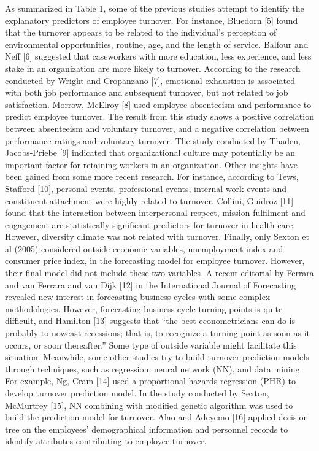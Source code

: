 As summarized in Table 1, some of the previous studies attempt to identify the explanatory predictors of employee turnover. For instance, Bluedorn [5] found that the turnover appears to be related to the individual’s perception of environmental opportunities, routine, age, and the length of service. Balfour and Neff [6] suggested that caseworkers with more education, less experience, and less stake in an organization are more likely to turnover. According to the research conducted by Wright and Cropanzano [7], emotional exhaustion is associated with both job performance and subsequent turnover, but not related to job satisfaction. Morrow, McElroy [8] used employee absenteeism and performance to predict employee turnover. The result from this study shows a positive correlation between absenteeism and voluntary turnover, and a negative correlation between performance ratings and voluntary turnover. The study conducted by Thaden, Jacobs-Priebe [9] indicated that organizational culture may potentially be an important factor for retaining  workers in an organization.  
Other insights have been gained from some more recent research.  For instance, according to Tews, Stafford [10], personal events, professional events, internal work events and constituent attachment were highly related to turnover. Collini, Guidroz [11] found that the interaction between interpersonal respect, mission fulfilment and engagement are statistically significant predictors for turnover in health care. However, diversity climate was not related with turnover. Finally, only Sexton et al (2005) considered outside economic variables, unemployment index and consumer price index, in the forecasting model for employee turnover. However, their final model did not include these two variables.  A recent editorial by Ferrara and van Ferrara and van Dijk [12] in the International Journal of Forecasting revealed new interest in forecasting business cycles with some complex methodologies. However, forecasting business cycle turning points is quite difficult, and Hamilton [13] suggests that “the best econometricians can do is probably to nowcast recessions; that is, to recognize a turning point as soon as it occurs, or soon thereafter.”  Some type of outside variable might facilitate this situation.
Meanwhile, some other studies try to build turnover prediction models through techniques, such as regression, neural network (NN), and data mining. For example, Ng, Cram [14] used a proportional hazards regression (PHR) to develop turnover prediction model. In the study conducted by Sexton, McMurtrey [15], NN combining with modified genetic algorithm was used to build the prediction model for turnover. Alao and Adeyemo [16] applied decision tree on the employees’ demographical information and personnel records to identify attributes contributing to employee turnover.
